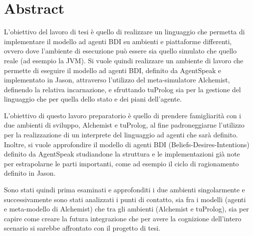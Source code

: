\chapter*{Abstract} %



L'obiettivo del lavoro di tesi è quello di realizzare un linguaggio che permetta di implementare il modello ad agenti BDI su ambienti e piattaforme differenti, ovvero dove l'ambiente di esecuzione può essere sia quello simulato che quello reale (ad esempio la JVM).
Si vuole quindi realizzare un ambiente di lavoro che permette di eseguire il modello ad agenti BDI, definito da AgentSpeak e implementato in Jason, attraverso l'utilizzo del meta-simulatore Alchemist, definendo la relativa incarnazione, e sfruttando tuProlog sia per la gestione del linguaggio che per quella dello stato e dei piani dell'agente.

L'obiettivo di questo lavoro preparatorio è quello di prendere famigliarità con i due ambienti di sviluppo, Alchemist e tuProlog, al fine padroneggiarne l'utilizzo per la realizzazione di un interprete del linguaggio ad agenti che sarà definito.
Inoltre, si vuole approfondire il modello di agenti BDI (Beliefs-Desires-Intentions) definito da AgentSpeak studiandone la struttura e le implementazioni già note per estrapolarne le parti importanti, come ad esempio il ciclo di ragionamento definito in Jason.

Sono stati quindi prima esaminati e approfonditi i due ambienti singolarmente e successivamente sono stati analizzati i punti di contatto, sia fra i modelli (agenti e meta-modello di Alchemist) che tra gli ambienti (Alchemist e tuProlog), sia per capire come creare la futura integrazione che per avere la cognizione dell'intero scenario si sarebbe affrontato con il progetto di tesi.

\clearpage{\pagestyle{empty}\cleardoublepage}

\tableofcontents

\rhead[\fancyplain{}{\bfseries\leftmark}]{\fancyplain{}{\bfseries\thepage}}

